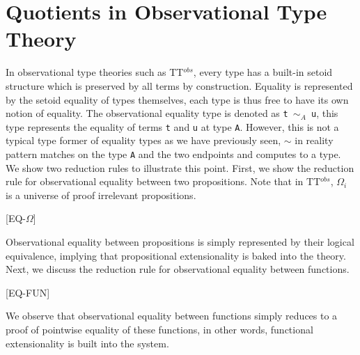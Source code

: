 \documentclass[12pt,twoside,maitrise]{dms}
\theoremstyle{definition}
\numberwithin{equation}{section}
\numberwithin{table}{chapter}
\numberwithin{figure}{chapter}
\newcommand\kw[1] {\textsf{#1}}
\newcommand\id[1] {\texttt{#1}}
\newcommand\fn[1] {\texttt{#1}}
\begin{document}
\section{Quotients in Observational Type Theory}


In observational type theories such as TT$^{obs}$\cite{pujet2022observational},
every type has a built-in setoid structure which is preserved by all terms by
construction. Equality is represented by the setoid equality of types
themselves, each type is thus free to have its own notion of equality. The
observational equality type is denoted as \fn{t $\sim_A$ u}, this type
represents the equality of terms \id{t} and \id{u} at type \id{A}. However, this
is not a typical type former of equality types as we have previously seen,
$\sim$ in reality pattern matches on the type \id{A} and the two endpoints and
computes to a type. We show two reduction rules to illustrate this point. First,
we show the reduction rule for observational equality between two propositions.
Note that in TT$^{obs}$, $\Omega_i$ is a universe of proof irrelevant
propositions.

\begin{prooftree*}

  [\kw{EQ-$\Omega$}]{}
\end{prooftree*}

Observational equality between propositions is simply represented by their
logical equivalence, implying that propositional extensionality is baked into
the theory. Next, we discuss the reduction rule for observational equality
between functions.

\begin{prooftree*}

  [\kw{EQ-FUN}]{}
\end{prooftree*}

We observe that observational equality between functions simply reduces to a
proof of pointwise equality of these functions, in other words, functional
extensionality is built into the system.
\end{document}
